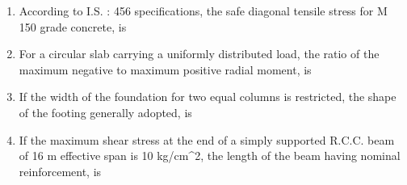 \documentclass[11pt,a4paper]{article}
\begin{document}
\begin{enumerate}
{}
\\
\item{According to I.S. : 456 specifications, the safe diagonal tensile stress for M 150 grade concrete, is}
\\
\item{For a circular slab carrying a uniformly distributed load, the ratio of the maximum negative to maximum positive radial moment, is}
\\
\item{If the width of the foundation for two equal columns is restricted, the shape of the footing generally adopted, is}
\\
\item{If the maximum shear stress at the end of a simply supported R.C.C. beam of 16 m effective span is 10 kg/cm\^{}2, the length of the beam having nominal reinforcement, is
}
\end{enumerate}
\end{document}
